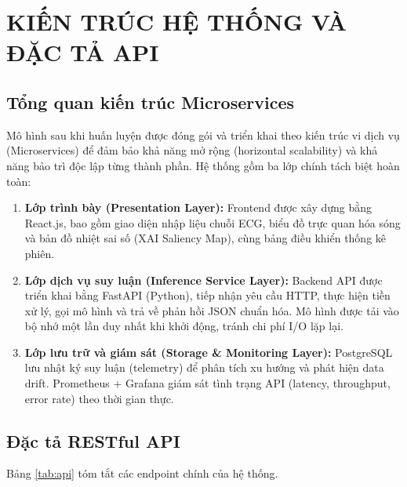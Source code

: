 \documentclass[conference]{IEEEtran}
\begin{document}
\section{KIẾN TRÚC HỆ THỐNG VÀ ĐẶC TẢ API}

\subsection{Tổng quan kiến trúc Microservices}
Mô hình sau khi huấn luyện được đóng gói và triển khai theo kiến trúc vi dịch vụ (Microservices) để đảm bảo khả năng mở rộng (horizontal scalability) và khả năng bảo trì độc lập từng thành phần. Hệ thống gồm ba lớp chính tách biệt hoàn toàn:

\begin{enumerate}
\item \textbf{Lớp trình bày (Presentation Layer):} Frontend được xây dựng bằng React.js, bao gồm giao diện nhập liệu chuỗi ECG, biểu đồ trực quan hóa sóng và bản đồ nhiệt sai số (XAI Saliency Map), cùng bảng điều khiển thống kê phiên.
\item \textbf{Lớp dịch vụ suy luận (Inference Service Layer):} Backend API được triển khai bằng FastAPI (Python), tiếp nhận yêu cầu HTTP, thực hiện tiền xử lý, gọi mô hình và trả về phản hồi JSON chuẩn hóa. Mô hình được tải vào bộ nhớ một lần duy nhất khi khởi động, tránh chi phí I/O lặp lại.
\item \textbf{Lớp lưu trữ và giám sát (Storage \& Monitoring Layer):} PostgreSQL lưu nhật ký suy luận (telemetry) để phân tích xu hướng và phát hiện data drift. Prometheus + Grafana giám sát tình trạng API (latency, throughput, error rate) theo thời gian thực.
\end{enumerate}

\subsection{Đặc tả RESTful API}
Bảng \ref{tab:api} tóm tắt các endpoint chính của hệ thống.

\begin{table}[htbp]
\caption{Đặc tả RESTful API cho dịch vụ suy luận ECG}
\centering
{}
\label{tab:api}
\end{table}
\end{document}
